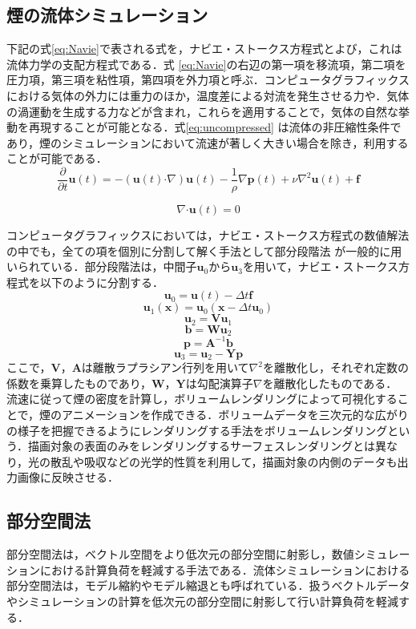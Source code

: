 \documentclass[uplatex,dvipdfmx,10pt,a4paper,notitlepage,oneside,twocolumn]{abst_jsarticle}
\begin{document}
\subsection{煙の流体シミュレーション}
下記の式\ref{eq:Navie}で表される式を，ナビエ・ストークス方程式とよび，これは流体力学の支配方程式である．式 \ref{eq:Navie}の右辺の第一項を移流項，第二項を圧力項，第三項を粘性項，第四項を外力項と呼ぶ．コンピュータグラフィックスにおける気体の外力には重力のほか，温度差による対流を発生させる力や．気体の渦運動を生成する力などが含まれ，これらを適用することで，気体の自然な挙動を再現することが可能となる．式\ref{eq:uncompressed} は流体の非圧縮性条件であり，煙のシミュレーションにおいて流速が著しく大きい場合を除き，利用することが可能である．
	\begin{equation}\label{eq:Navie}
		\frac{\partial}{\partial t}\bm{u} (t)  = - (\bm{u} (t)  \boldsymbol{\cdot}\nabla) \bm{u} (t)   - \frac{1}{\rho}\nabla \bm{p} (t)  + \nu\nabla^2\bm{u} (t)  + \bm{f}
	\end{equation}
	
	\begin{equation}\label{eq:uncompressed}
		\nabla\boldsymbol{\cdot}\bm{u} (t)  = 0
	\end{equation}
	
コンピュータグラフィックスにおいては，ナビエ・ストークス方程式の数値解法の中でも，全ての項を個別に分割して解く手法として部分段階法 \cite{Chorin}が一般的に用いられている．部分段階法は，中間子$\bm{u}_0$から$\bm{u}_3$を用いて，ナビエ・ストークス方程式を以下のように分割する．
\[
	\bm{u}_0 =  \bm{u} (t)  - \varDelta t \bm{f} 	
\]
\[
	\bm{u}_1(\bm{x}) = \bm{u}_0(\bm{x}  - \varDelta t \bm{u}_0)
\]
\[
	\bm{u}_2   =  \bm{V}\bm{u}_1
\]
\[
	\bm{b} = \bm{W}\bm{u}_2
\]
\[
	\bm{p} = \bm{A}^{-1}\bm{b}
\]
\[
	\bm{u}_3  =  \bm{u}_2 - \bm{Y}\bm{p} 
\]
ここで，$\bm{V}$，$\bm{A}$は離散ラプラシアン行列を用いて$\nabla^2$を離散化し，それぞれ定数の係数を乗算したものであり，$\bm{W}$，$\bm{Y}$は勾配演算子$\nabla$を離散化したものである．
流速に従って煙の密度を計算し，ボリュームレンダリングによって可視化することで，煙のアニメーションを作成できる．ボリュームデータを三次元的な広がりの様子を把握できるようにレンダリングする手法をボリュームレンダリングという．描画対象の表面のみをレンダリングするサーフェスレンダリングとは異なり，光の散乱や吸収などの光学的性質を利用して，描画対象の内側のデータも出力画像に反映させる．
\subsection{部分空間法}
部分空間法は，ベクトル空間をより低次元の部分空間に射影し，数値シミュレーションにおける計算負荷を軽減する手法である．流体シミュレーションにおける部分空間法は，モデル縮約やモデル縮退とも呼ばれている．扱うベクトルデータやシミュレーションの計算を低次元の部分空間に射影して行い計算負荷を軽減する．
\end{document}

